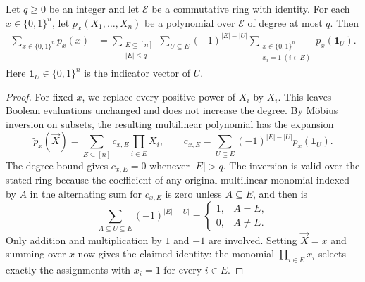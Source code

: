 \begin{lemma}\label{lem:boolean-differences}
Let $q\ge0$ be an integer and let $\mathcal E$ be a commutative
ring with identity. For each $x\in\{0,1\}^n$, let
$p_x(X_1,\ldots,X_n)$ be a polynomial over $\mathcal E$ of degree
at most $q$. Then
\begin{align}
 \sum_{x\in\{0,1\}^n}p_x(x)
 &=\sum_{\substack{E\subseteq[n]\\|E|\le q}}
   \sum_{U\subseteq E}(-1)^{|E|-|U|}
   \sum_{\substack{x\in\{0,1\}^n\\x_i=1\ (i\in E)}}
                  p_x(\mathbf1_U).
 \label{eq:boolean-differences}
\end{align}
Here $\mathbf1_U\in\{0,1\}^n$ is the indicator vector of $U$.
\end{lemma}
\begin{proof}
For fixed $x$, we replace every positive power of $X_i$ by $X_i$.
This leaves Boolean evaluations unchanged and does not increase
the degree. By M\"obius inversion on subsets, the resulting
multilinear polynomial has the expansion
\[
 \widetilde p_x(\vec{X})=\sum_{E\subseteq[n]}c_{x,E}\prod_{i\in E}X_i,
 \qquad
 c_{x,E}=\sum_{U\subseteq E}(-1)^{|E|-|U|}p_x(\mathbf1_U).
\]
The degree bound gives $c_{x,E}=0$ whenever $|E|>q$.
The inversion is valid over the stated ring because the coefficient
of any original multilinear monomial indexed by $A$ in the
alternating sum for $c_{x,E}$ is zero unless $A\subseteq E$, and
then is
\[
 \sum_{A\subseteq U\subseteq E}(-1)^{|E|-|U|}
 =\begin{cases}1,&A=E,\\0,&A\ne E.\end{cases}
\]
Only addition and multiplication by $1$ and $-1$ are involved.
Setting $\vec{X}=x$ and summing over $x$ now gives the claimed identity:
the monomial $\prod_{i\in E}x_i$
selects exactly the assignments with $x_i=1$ for every $i\in E$.
\end{proof}

